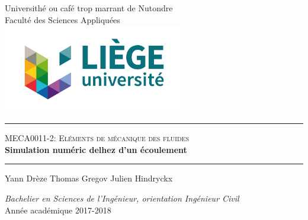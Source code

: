 \documentclass[a4paper,12pt]{article}
\begin{document}
\renewcommand{\contentsname}{Table des matières}
\renewcommand{\listfigurename}{Liste des figures}
\renewcommand{\listtablename}{Liste des tableaux}

\renewcommand{\thesection}{\arabic{section}.}
\renewcommand{\thesubsection}{\arabic{section}.\arabic{subsection}.}
\renewcommand{\thesubsubsection}{\arabic{section}.\arabic{subsection}.\arabic{subsubsection}.}


\thispagestyle{empty}
\begin{center}
	\Large Universithé ou café trop marrant de Nutondre\\
	Faculté des Sciences Appliquées\\
	\vspace{0.5cm}
	\includegraphics[width=8cm]{ulg.jpg}
\end{center}
\vspace*{3cm}
 \begin{center}
	\noindent\rule[0.5ex]{\textwidth}{1pt}
	\textsc{\large MECA0011-2: Eléments de mécanique des fluides}\\
	\vspace*{0.1cm}
	\bfseries \Huge Simulation numéric delhez d'un écoulement
 	\vspace*{-0.6cm}
	\noindent\rule[0.5ex]{\textwidth}{1pt}
\end{center}
\centerline{\large Yann {\sc Drèze}   \quad Thomas {\sc Gregov} \quad Julien {\sc Hindryckx}}
\vfill
\begin{center}
	\large\textsl{Bachelier en Sciences de l'Ingénieur, orientation Ingénieur Civil }\\
	\vspace*{0.5cm}
	Année académique 2017-2018
\end{center}
\pagebreak
\newpage
{}
\fancyhead[R]{}

\doparttoc
\tableofcontents

\newpage
\fancyhead[R]{}
\listoffigures
\listoftables
\newpage
\renewcommand{\sectionmark}[1]{\markboth{#1}{}}
\end{document}
